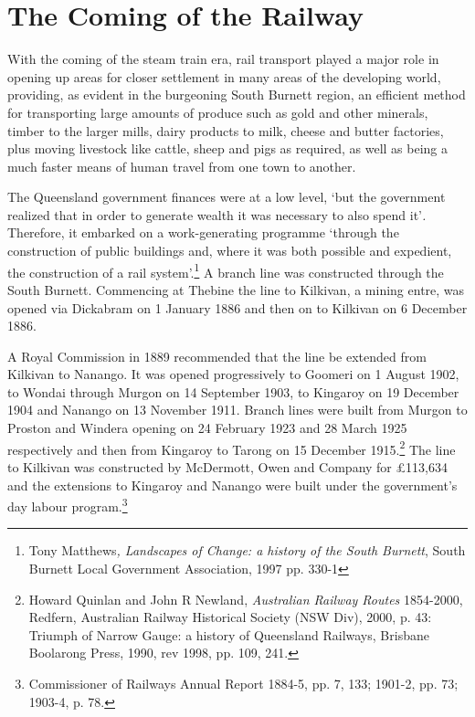 \hypertarget{the-coming-of-the-railway}{%
\section{The Coming of the Railway}\label{the-coming-of-the-railway}}

With the coming of the steam train era, rail transport played a major
role in opening up areas for closer settlement in many areas of the
developing world, providing, as evident in the burgeoning South Burnett
region, an efficient method for transporting large amounts of produce
such as gold and other minerals, timber to the larger mills, dairy
products to milk, cheese and butter factories, plus moving livestock
like cattle, sheep and pigs as required, as well as being a much faster
means of human travel from one town to another.

The Queensland government finances were at a low level, `but the
government realized that in order to generate wealth it was necessary to
also spend it'\emph{.} Therefore, it embarked on a work-generating
programme `through the construction of public buildings and, where it
was both possible and expedient, the construction of a rail
system'.\footnote{Tony Matthews\emph{, Landscapes of Change: a history
  of the South Burnett}, South Burnett Local Government Association,
  1997 pp. 330-1} A branch line was constructed through the South
Burnett. Commencing at Thebine the line to Kilkivan, a mining entre, was
opened via Dickabram on 1 January 1886 and then on to Kilkivan on 6
December 1886.

A Royal Commission in 1889 recommended that the line be extended from
Kilkivan to Nanango. It was opened progressively to Goomeri on 1 August
1902, to Wondai through Murgon on 14 September 1903, to Kingaroy on 19
December 1904 and Nanango on 13 November 1911. Branch lines were built
from Murgon to Proston and Windera opening on 24 February 1923 and 28
March 1925 respectively and then from Kingaroy to Tarong on 15 December
1915.\footnote{Howard Quinlan and John R Newland, \emph{Australian
  Railway Routes} 1854-2000, Redfern, Australian Railway Historical
  Society (NSW Div), 2000, p. 43: Triumph of Narrow Gauge: a history of
  Queensland Railways, Brisbane Boolarong Press, 1990, rev 1998, pp.
  109, 241.} The line to Kilkivan was constructed by McDermott, Owen and
Company for £113,634 and the extensions to Kingaroy and Nanango were
built under the government's day labour program.\footnote{Commissioner
  of Railways Annual Report 1884-5, pp. 7, 133; 1901-2, pp. 73; 1903-4,
  p. 78.}

